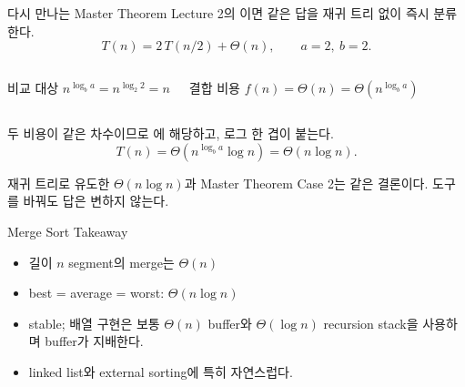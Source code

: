 \begin{frame}{다시 만나는 Master Theorem}
Lecture 2의 이면 같은 답을 재귀 트리 없이 즉시 분류한다.
\[
T(n)=2\,T(n/2)+\Theta(n),\qquad a=2,\ b=2.
\]
\begin{columns}[T,onlytextwidth]
  \begin{block}{비교 대상}
  \(n^{\log_b a}=n^{\log_2 2}=n\)
  \end{block}
  \begin{block}{결합 비용}
  \(f(n)=\Theta(n)=\Theta\!\left(n^{\log_b a}\right)\)
  \end{block}
\end{columns}
\vspace{2mm}
두 비용이 같은 차수이므로 에 해당하고, 로그 한 겹이 붙는다.
\[
T(n)=\Theta\!\left(n^{\log_b a}\log n\right)=\Theta(n\log n).
\]
\begin{takeaway}재귀 트리로 유도한 \(\Theta(n\log n)\)과 Master Theorem Case 2는 같은 결론이다. 도구를 바꿔도 답은 변하지 않는다.\end{takeaway}
\end{frame}
\begin{frame}{Merge Sort Takeaway}
\begin{itemize}\item 길이 $n$ segment의 merge는 $\Theta(n)$\item best = average = worst: $\Theta(n\log n)$\item stable; 배열 구현은 보통 $\Theta(n)$ buffer와 $\Theta(\log n)$ recursion stack을 사용하며 buffer가 지배한다.\item linked list와 external sorting에 특히 자연스럽다.\end{itemize}
\end{frame}
